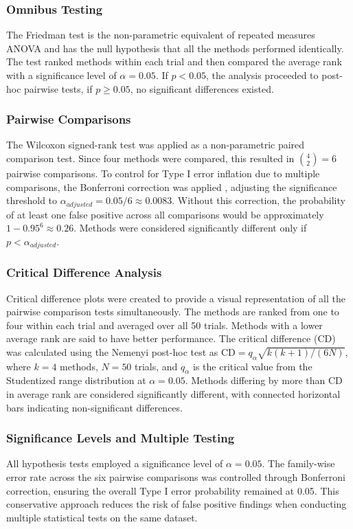 \documentclass[10pt, conference]{IEEEtran}
\begin{document}
\subsubsection{Omnibus Testing}
The Friedman test \cite{friedman1937} is the non-parametric equivalent of repeated measures ANOVA and has the null hypothesis that all the methods performed identically.  The test ranked methods within each trial and then compared the average rank with a significance level of $\alpha=0.05$. If $p <0.05$, the analysis proceeded to post-hoc pairwise tests, if $p \ge 0.05$, no significant differences existed.

\subsubsection{Pairwise Comparisons}
The Wilcoxon signed-rank test was applied as a non-parametric paired comparison test. Since four methods were compared, this resulted in $\binom{4}{2} = 6$ pairwise comparisons. To control for Type I error inflation due to multiple comparisons, the Bonferroni correction was applied \cite{bonferroni1936}, adjusting the significance threshold to $\alpha_{adjusted} = 0.05 / 6 \approx 0.0083$. Without this correction, the probability of at least one false positive across all comparisons would be approximately $1 - 0.95^6 \approx 0.26$. Methods were considered significantly different only if $p < \alpha_{adjusted}$.

\subsubsection{Critical Difference Analysis}
Critical difference plots were created to provide a visual representation of all the pairwise comparison tests simultaneously. The methods are ranked from one to four within each trial and averaged over all 50 trials. Methods with a lower average rank are said to have better performance. The critical difference (CD) was calculated using the Nemenyi post-hoc test \cite{nemenyi1963} as $\text{CD} = q_{\alpha} \sqrt{k(k+1)/(6N)}$, where $k=4$ methods, $N=50$ trials, and $q_{\alpha}$ is the critical value from the Studentized range distribution at $\alpha = 0.05$. Methods differing by more than CD in average rank are considered significantly different, with connected horizontal bars indicating non-significant differences.


\subsubsection{Significance Levels and Multiple Testing}
All hypothesis tests employed a significance level of $\alpha = 0.05$. The family-wise error rate across the six pairwise comparisons was controlled through Bonferroni correction, ensuring the overall Type I error probability remained at 0.05. This conservative approach reduces the risk of false positive findings when conducting multiple statistical tests on the same dataset.
\end{document}
